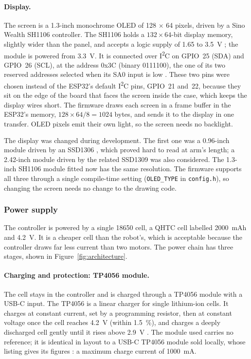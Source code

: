 \paragraph{Display.} The screen is a 1.3-inch monochrome OLED of 128 \(\times\) 64 pixels,
driven by a Sino Wealth SH1106 controller. The SH1106 holds a \(132 \times 64\)-bit
display memory, slightly wider than the panel, and accepts a logic supply of 1.65 to
3.5~V \cite{sh1106_datasheet}; the module is powered from 3.3~V. It is connected over
I\textsuperscript{2}C on GPIO~25 (SDA) and GPIO~26 (SCL), at the address 0x3C (binary
0111100), the one of its two reserved addresses selected when its SA0 input is low
\cite{sh1106_datasheet}. These two pins were chosen instead of the ESP32's default
I\textsuperscript{2}C pins, GPIO~21 and~22, because they sit on the edge of the board that
faces the screen inside the case, which keeps the display wires short. The firmware draws
each screen in a frame buffer in the ESP32's memory, \(128 \times 64 / 8 = 1024\) bytes,
and sends it to the display in one transfer. OLED pixels emit their own light, so the
screen needs no backlight.

The display was changed during development. The first one was a 0.96-inch module driven
by an SSD1306 \cite{ssd1306_datasheet}, which proved hard to read at arm's length; a
2.42-inch module driven by the related SSD1309 was also considered. The 1.3-inch SH1106
module fitted now has the same resolution. The firmware supports all three through a
single compile-time setting (\texttt{OLED\_TYPE} in \texttt{config.h}), so changing the
screen needs no change to the drawing code.

\subsubsection{Power supply}
\label{sec:con-power}
The controller is powered by a single 18650 cell, a QHTC cell labelled 2000~mAh and
4.2~V. It is a cheaper cell than the robot's, which is acceptable because the controller
draws far less current than two motors. The power chain has three stages, shown in
Figure~\ref{fig:architecture}.

\paragraph{Charging and protection: TP4056 module.} The cell stays in the controller and
is charged through a TP4056 module with a USB-C input. The TP4056 is a linear charger for
single lithium-ion cells. It charges at constant current, set by a programming resistor,
then at constant voltage once the cell reaches 4.2~V (within 1.5~\%), and charges a deeply
discharged cell gently until it rises above 2.9~V \cite{tp4056_datasheet}. The module
used carries no reference; it is identical in layout to a USB-C TP4056 module sold
locally, whose listing gives its figures \cite{esp32lab_tp4056}: a maximum charge current of
1000~mA.

